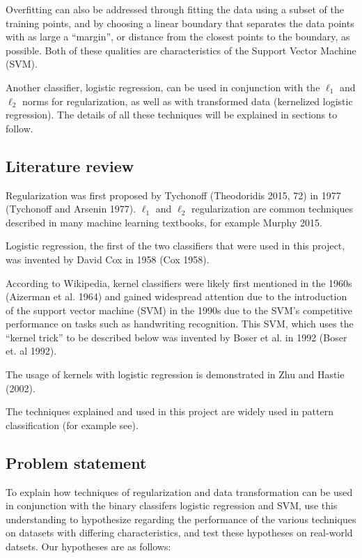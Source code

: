 \documentclass[letterpaper, 11pt]{article}
\begin{document}
Overfitting can also be addressed through fitting the data using a subset of the training points, and by choosing a linear boundary that separates the data points with as large a ``margin'', or distance from the closest points to the boundary, as possible. Both of these qualities are characteristics of the Support Vector Machine (SVM).

Another classifier, logistic regression, can be used in conjunction with the $\ell_1$ and $\ell_2$ norms for regularization, as well as with transformed data (kernelized logistic regression). The details of all these techniques will be explained in sections to follow.

\subsection{Literature review}

Regularization was first proposed by Tychonoff (Theodoridis 2015, 72) in 1977 (Tychonoff and Arsenin 1977). $\ell_1$ and $\ell_2$ regularization are common techniques described in many machine learning textbooks, for example Murphy 2015.

Logistic regression, the first of the two classifiers that were used in this project, was invented by David Cox in 1958 (Cox 1958).

According to Wikipedia, kernel classifiers were likely first mentioned in the 1960s (Aizerman et al. 1964) and gained widespread attention due to the introduction of the support vector machine (SVM) in the 1990s due to the SVM's competitive performance on tasks such as handwriting recognition. This SVM, which uses the ``kernel trick'' to be described below was invented by Boser et al. in 1992 (Boser et. al 1992).

The usage of kernels with logistic regression is demonstrated in Zhu and Hastie (2002).

The techniques explained and used in this project are widely used in pattern classification (for example see).

\subsection{Problem statement}

To explain how techniques of regularization and data transformation can be used in conjunction with the binary classifers logistic regression and SVM, use this understanding to hypothesize regarding the performance of the various techniques on datasets with differing characteristics, and test these hypotheses on real-world datsets. Our hypotheses are as follows:
\end{document}

